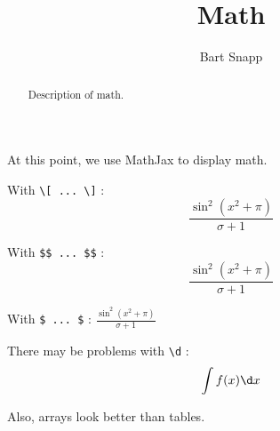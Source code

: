 


\title{Math}

\author{Bart Snapp}


\begin{abstract}
  Description of math.
\end{abstract}
\maketitle

At this point, we use MathJax to display math.

With \verb|\[ ... \]| :
\[
\frac{\sin^2(x^2+\pi)}{\sigma + 1}
\]

With \verb|$$ ... $$| :
$$
\frac{\sin^2(x^2+\pi)}{\sigma + 1}
$$

With \verb|$ ... $| :
$
\frac{\sin^2(x^2+\pi)}{\sigma + 1}
$


There may be problems with \verb|\d| :
\[
\int f(x) \d x
\]


Also, arrays look better than tables.



